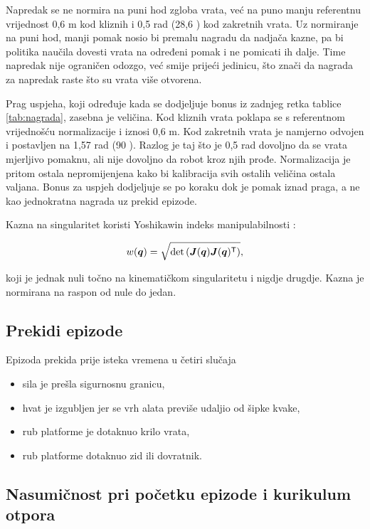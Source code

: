 Napredak se ne normira na puni hod zgloba vrata, već na puno manju referentnu vrijednost
0,6 m kod kliznih i 0,5 rad (28,6 \textdegree) kod zakretnih vrata. Uz normiranje na puni hod,
manji pomak nosio bi premalu nagradu da nadjača kazne, pa bi politika naučila dovesti vrata na
određeni pomak i ne pomicati ih dalje. Time napredak nije ograničen odozgo, već smije prijeći jedinicu,
što znači da nagrada za napredak raste što su vrata više otvorena.

Prag uspjeha, koji određuje kada se dodjeljuje bonus iz zadnjeg retka tablice \ref{tab:nagrada},
zasebna je veličina. Kod kliznih vrata poklapa se s referentnom vrijednošću normalizacije i iznosi
0,6 m. Kod zakretnih vrata je namjerno odvojen i postavljen na 1,57 rad (90 \textdegree).
Razlog je taj što je 0,5 rad dovoljno da se vrata mjerljivo pomaknu, ali nije dovoljno da
robot kroz njih prođe. Normalizacija je pritom ostala nepromijenjena kako bi kalibracija
svih ostalih veličina ostala valjana. Bonus za uspjeh dodjeljuje se po koraku dok je pomak
iznad praga, a ne kao jednokratna nagrada uz prekid epizode.

Kazna na singularitet koristi Yoshikawin indeks manipulabilnosti \cite{yoshikawa1985manipulability}:

\begin{equation}
    w(\bm{q}) = \sqrt{\det\left( \bm{J}(\bm{q}) \bm{J}(\bm{q})^{\mathsf{T}} \right)} ,
    \label{eq:manip}
\end{equation}

koji je jednak nuli točno na kinematičkom singularitetu i nigdje drugdje. Kazna je normirana na
raspon od nule do jedan.

\subsection{Prekidi epizode}
\label{sec:prekidi}

Epizoda prekida prije isteka vremena u četiri slučaja

\begin{itemize}
    \item sila je prešla sigurnosnu granicu,
    \item hvat je izgubljen jer se vrh alata previše udaljio od šipke kvake,
    \item rub platforme je dotaknuo krilo vrata,
    \item rub platforme dotaknuo zid ili dovratnik.
\end{itemize}

\subsection{Nasumičnost pri početku epizode i kurikulum otpora}
\label{sec:nasumicnost}

